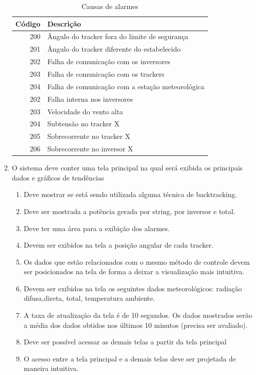 \documentclass[a4paper,12pt]{article}
\begin{document}
\begin{enumerate}
        
\begin{table}[htbp]
\begin{center}
\begin{tabular}{|r|l|}
\hline
\textbf{Código} & \textbf{Descrição} \\
\hline
200 & Ângulo do tracker fora do limite de segurança\\
201 & Ângulo do tracker diferente do estabelecido\\
202 & Falha de comunicação com os inversores\\
203 & Falha de comunicação com os trackers\\
204 & Falha de comunicação com a estação meteorológica\\
202 & Falha interna nos inversores \\
203 & Velocidade do vento alta \\
204 & Subtensão no tracker X\\
205 & Sobrecorrente no tracker X\\
206 & Sobrecorrente no inversor X\\
\hline
\end{tabular}
\caption{Causas de alarmes}
\label{tab:alarmes}
\end{center}
\end{table}

    \item O sistema deve conter uma tela principal na qual será exibida os principais dados e gráficos de tendências
        \begin{enumerate}
            \item Deve mostrar se está sendo utilizada alguma técnica de backtracking.
            \item Deve ser mostrada a potência gerada por string, por inversor e total.
            \item Deve ter uma área para a exibição dos alarmes.
            \item Devem ser exibidos na tela a posição angular de cada tracker.
            \item Os dados que estão relacionados com o mesmo método de controle devem ser posicionados na tela de forma a deixar a visualização mais intuitiva.
             \item Devem ser exibidos na tela os seguintes dados meteorológicos: radiação difusa,direta, total, temperatura ambiente.
            \item A taxa de atualização da tela é de  10 segundos. Os dados mostrados serão a média dos dados obtidos nos últimos 10 minutos (precisa ser avaliado).
            \item Deve ser possível acessar as demais telas a partir da tela principal
            \item O acesso entre a tela principal e a demais telas deve ser projetada de maneira intuitiva. 
        \end{enumerate}
        

\end{enumerate}
\end{document}
